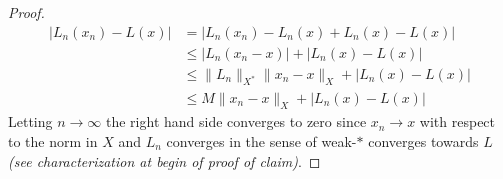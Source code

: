 \documentclass[12pt,a4paper]{article}
\theoremstyle{definition}
\begin{document}
\begin{proof}
\begin{align*}
|L_n(x_n)-L(x)| &= |L_n(x_n)-L_n(x) + L_n(x)-L(x)| 
\\
& \leq | L_n (x_n-x)| + |L_n(x)-L(x)|  \\
& \leq \|L_n\|_{X^*} \|x_n-x\|_X + |L_n(x)-L(x)| \\
& \leq M \|x_n-x\|_X + |L_n(x) - L(x)|
\end{align*}
Letting $n \to \infty$ the right hand side converges to zero since $x_n \to x$ with respect to the norm in $X$ and $L_n$ converges in the sense of weak-$*$ converges towards $L$ \textit{(see characterization at begin of proof of claim)}. 
\end{proof}
\end{document}

